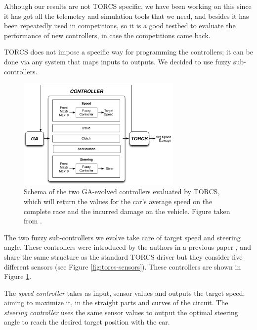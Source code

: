 \documentclass[10pt,journal,compsoc]{IEEEtran}
\begin{document}
Although our results are not TORCS specific, we have been
working on this since it has got all the telemetry and simulation
tools that we need, and besides it has been repeatedly used in
competitions, so it is a good testbed to evaluate the performance of new controllers, in case the competitions came back.

TORCS does not impose a specific way for programming the controllers;
it can be done via any system that maps inputs to outputs. We decided
to use fuzzy sub-controllers.


\label{subsec:fuzzy-controllers}

\begin{figure}[!ht]
  \begin{center}
    \includegraphics[width=8cm]{fig/flowchart}
  \end{center}
  \caption{Schema of the two GA-evolved controllers evaluated by TORCS, which will
    return the values for the car's average speed on the complete race
    and the incurred damage on the vehicle. Figure taken from
    \cite{salem_evo18}.}
    \label{fig:ga}
\end{figure}
%
The two fuzzy sub-controllers we evolve take care of target speed and steering angle. These controllers were introduced by the authors in a previous paper \cite{salem_evo17}, and share the same structure as the standard TORCS driver but they consider five different sensors (see Figure \ref{fig:torcs-sensors}). These controllers are shown in Figure \ref{fig:ga}. 


The \textit{speed controller} takes as input, sensor values and outputs the target speed; aiming to maximize it, in the straight parts and curves of the circuit. The \textit{steering controller} uses the same sensor values to output the optimal steering angle to reach the desired target position with the car.
\end{document}
